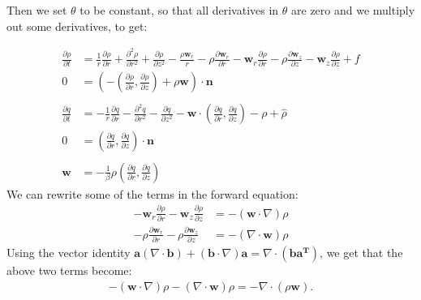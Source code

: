 \documentclass[11pt, a4paper]{article}
\theoremstyle{definition}
\newcommand{\w}{\mathbf{w}}
\newcommand{\n}{\mathbf{n}}
\newcommand{\hr}{\widehat \rho}
\begin{document}
	Then we set $\theta$ to be constant, so that all derivatives in $\theta$ are zero and we multiply out some derivatives, to get:
	
		\begin{align*}
		\frac{\partial \rho}{\partial t} &= \frac{1}{r} \frac{\partial \rho}{\partial r} +  \frac{\partial^2 \rho}{\partial r^2} + \frac{\partial \rho}{\partial z^2} - \frac{\rho\w_r}{r} -\rho\frac{\partial \w_r }{\partial r} -\w_r\frac{\partial \rho}{\partial r} - \rho\frac{\partial \w_z}{\partial z}- \w_z\frac{\partial \rho}{\partial z} + f\\
		0 &= \left(- \left(\frac{\partial \rho}{\partial r},  \frac{\partial \rho}{\partial z}\right) + \rho \w \right) \cdot \n \\
		\\
		\frac{\partial q}{\partial t} &= - \frac{1}{r} \frac{\partial q}{\partial r} -  \frac{\partial^2 q}{\partial r^2} - \frac{\partial q}{\partial z^2} - \w \cdot \left(\frac{\partial q}{\partial r},  \frac{\partial q}{\partial z}\right) - \rho + \hr\\
		0 &= \left(\frac{\partial q}{\partial r},  \frac{\partial q}{\partial z}\right) \cdot \n \\
		\\
		\w &= - \frac{1}{\beta}\rho  \left(\frac{\partial q}{\partial r},  \frac{\partial q}{\partial z}\right)
	\end{align*}
	We can rewrite some of the terms in the forward equation:
	\begin{align*}
		-\w_r\frac{\partial \rho}{\partial r} - \w_z\frac{\partial \rho}{\partial z} &= - \left(\w \cdot \nabla \right)\rho\\
		-\rho\frac{\partial \w_r }{\partial r} - \rho\frac{\partial \w_z}{\partial z} &= -\left(\nabla \cdot \w \right)\rho 
	\end{align*}
	Using the vector identity $\mathbf a (\nabla \cdot \mathbf b) + (\mathbf b \cdot \nabla ) \mathbf a = \nabla \cdot (\mathbf{b a^T})$, we get that the above two terms become:
	\begin{align*}
		- \left(\w \cdot \nabla \right)\rho - \left(\nabla \cdot \w \right)\rho = - \nabla \cdot (\rho\w ).
	\end{align*}
	
\end{document}
